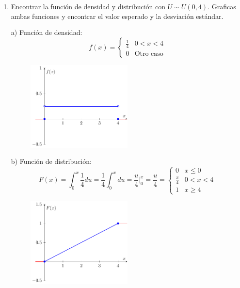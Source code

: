\documentclass[a4paper, 12pt]{article}
\newcommand{\Pspace}{0.5cm}
\newcommand{\Aspace}{0.2cm}
\begin{document}
\begin{enumerate}
        \vspace{\Pspace}
        \item Encontrar la función de densidad y distribución con $U \sim U(0, 4)$. Graficas ambas funciones y encontrar el valor esperado y la desviación estándar.
            \vspace{\Aspace} \par
            { \color{azul} 
                a) Función de densidad:
                \[
                    f(x) = 
                    \begin{cases}
                        \frac{1}{4} &   0 < x < 4 \\
                        0           &   \text{Otro caso}
                    \end{cases}
                \]
                \begin{figure}[H]
                    \centering
                    \includegraphics[width=0.5\textwidth]{Assets/Pdf/T10P2IA.pdf}
                \end{figure}

                \newpage
                b) Función de distribución:
                \[
                    F(x)
                    = \int_{0}^{x} \frac{1}{4}du
                    = \frac{1}{4} \int_{0}^{x}du
                    = \frac{u}{4} \Big|_{0}^{x}
                    = \frac{u}{4} =
                    \begin{cases}
                        0           &   x \leq 0 \\
                        \frac{x}{4} &   0 < x < 4 \\
                        1           &   x \geq 4
                    \end{cases}
                \]
                \begin{figure}[H]
                    \centering
                    \includegraphics[width=0.5\textwidth]{Assets/Pdf/T10P2IB.pdf}
                \end{figure}

}
\end{enumerate}
\end{document}
